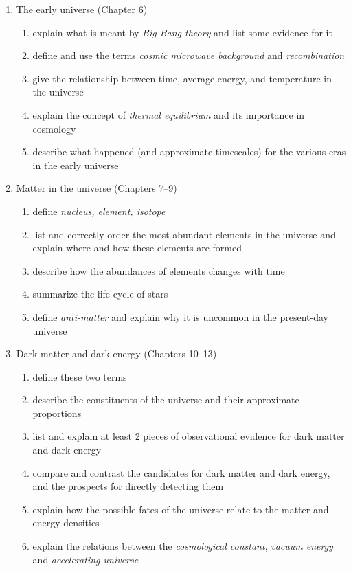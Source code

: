 \documentclass[11pt]{article}
\begin{document}
\begin{enumerate}
\item The early universe (Chapter 6)
\begin{enumerate}
\item  explain what is meant by {\em Big Bang theory} and list some evidence for it 
\item define and use the terms {\em cosmic microwave background} and {\em recombination}
\item give the relationship between time, average energy, and temperature in the universe 
\item explain the concept of {\em thermal equilibrium} and its importance in cosmology
\item describe what happened (and approximate timescales) for the various eras in the early universe 
\end{enumerate}

\clearpage

\item Matter in the universe (Chapters 7--9)
\begin{enumerate}
\item define {\em nucleus, element, isotope}
\item list and correctly order the most abundant elements in the universe and 
explain where and how these elements are formed
\item describe how the abundances of elements changes with time 
\item summarize the life cycle of stars
\item define {\em anti-matter} and explain why it is uncommon in the present-day universe
\end{enumerate}

\item Dark matter and dark energy (Chapters 10--13)
\begin{enumerate}
\item  define these two terms 
\item describe the constituents of the universe and their approximate proportions
\item list  and explain at least 2 pieces of observational evidence for dark matter and dark energy
\item compare and contrast the candidates for dark matter and dark energy, and the prospects for
directly detecting them
\item explain how the possible fates of the universe  relate to the matter and energy densities 
\item explain the relations between the {\em cosmological constant}, {\em vacuum energy} and {\em accelerating universe}
\end{enumerate}


\end{enumerate}
\end{document}
